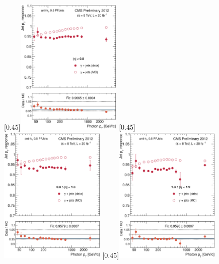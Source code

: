 \begin{figure}[p]
    \centering
    \subcaptionbox{\label{fig:bal_eta008}}[0.45\textwidth]{\includegraphics[width=0.45\textwidth]{chapitre4/figs/resp_balancing/response_eta008_balancing.eps}}\hfill
    \subcaptionbox{\label{fig:bal_eta0813}}[0.45\textwidth]{\includegraphics[width=0.45\textwidth]{chapitre4/figs/resp_balancing/response_eta0813_balancing.eps}}
    \subcaptionbox{\label{fig:bal_eta1319}}[0.45\textwidth]{\includegraphics[width=0.45\textwidth]{chapitre4/figs/resp_balancing/response_eta1319_balancing.eps}}\hfill

\end{figure}
